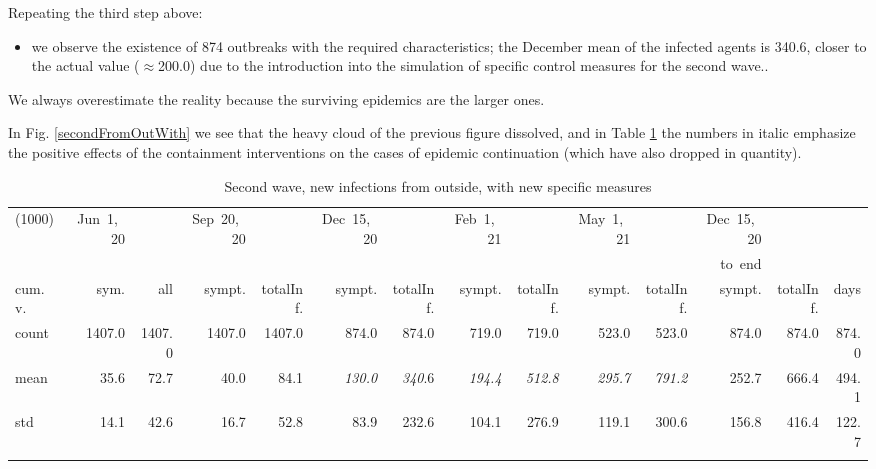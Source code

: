 \documentclass[graybox]{svmult}
\begin{document}
Repeating the third step above:
\begin{itemize}

\item we observe the existence of 874 outbreaks with the required characteristics; the December mean of the infected agents is 340.6, closer to the actual value ($\approx$200.0) due to the introduction into the simulation of specific control measures for the second wave.. 

\end{itemize}

We always overestimate the reality because the surviving epidemics are the larger ones.

In Fig. \ref{secondFromOutWith} we see that the heavy cloud of the previous figure dissolved, and in Table \ref{selForceWave2Contr2Tab} the numbers in italic emphasize the positive effects of the containment interventions on the cases of epidemic continuation (which have also dropped in quantity).


\begin{table}[t]
\center
\tiny
\begin{tabular}{lrrrrrrrrrrrrr}
\hline\noalign{\smallskip}
(1000) & Jun~1,~20 & & Sep~20,~20 & & Dec~15,~20 & & Feb~1,~21 & & May~1,~21 & & Dec~15,~20 \\
& & & & & & & & & & & to~end \\
cum.~v. & sym. & all & sympt. & totalInf. & sympt. & totalInf. & sympt. & totalInf. & sympt. & totalInf. & sympt. & totalInf. & days\\
\noalign{\smallskip}\svhline\noalign{\smallskip}
count & 1407.0 & 1407.0 & 1407.0 & 1407.0 & 874.0 & 874.0 & 719.0 & 719.0 & 523.0 & 523.0 & 874.0 & 874.0 & 874.0 \\
mean & 35.6 & 72.7 & 40.0 & 84.1 & \emph{130.0} & \emph{340}.6 & \emph{194.4} & \emph{512.8} & \emph{295.7} & \emph{791.2} & 252.7 & 666.4 & 494.1 \\
std & 14.1 & 42.6 & 16.7 & 52.8 & 83.9 & 232.6 & 104.1 & 276.9 & 119.1 & 300.6 & 156.8 & 416.4 & 122.7 \\
\hline\noalign{\smallskip}
\end{tabular}
\caption{Second wave, new infections from outside, with new specific measures}
\label{selForceWave2Contr2Tab}
\end{table}



\end{document}
